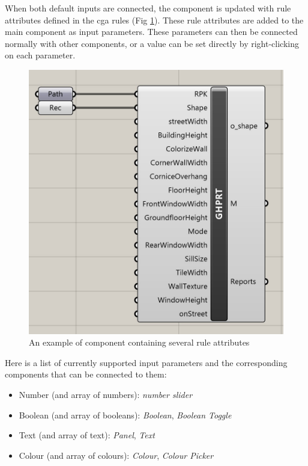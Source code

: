 \vspace{0.1in}
When both default inputs are connected, the component is updated with rule attributes defined in the cga rules (Fig \ref{fig:gh_rule_attribs}). These rule attributes are added to the main component as input parameters. These parameters can then be connected normally with other components, or a value can be set directly by right-clicking on each parameter.

\begin{figure}
    \centering
    \includegraphics[width=0.9\linewidth]{res/man_gh_rule_attributes}
    \caption{An example of component containing several rule attributes}
    \label{fig:gh_rule_attribs}
\end{figure}

\vspace{0.1in}
Here is a list of currently supported input parameters and the corresponding components that can be connected to them:
\begin{itemize}
    \item Number (and array of numbers): \textit{number slider}
    \item Boolean (and array of booleans): \textit{Boolean}, \textit{Boolean Toggle}
    \item Text (and array of text): \textit{Panel}, \textit{Text}
    \item Colour (and array of colours): \textit{Colour}, \textit{Colour Picker}
\end{itemize}

